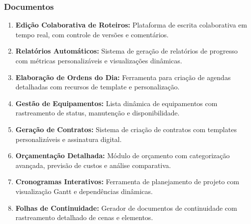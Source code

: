 \subsubsection{Documentos}
\begin{enumerate}[leftmargin=*]
    \item \textbf{Edição Colaborativa de Roteiros:} Plataforma de escrita colaborativa em tempo real, com controle de versões e comentários.
    \item \textbf{Relatórios Automáticos:} Sistema de geração de relatórios de progresso com métricas personalizáveis e visualizações dinâmicas.
    \item \textbf{Elaboração de Ordens do Dia:} Ferramenta para criação de agendas detalhadas com recursos de template e personalização.
    \item \textbf{Gestão de Equipamentos:} Lista dinâmica de equipamentos com rastreamento de status, manutenção e disponibilidade.
    \item \textbf{Geração de Contratos:} Sistema de criação de contratos com templates personalizáveis e assinatura digital.
    \item \textbf{Orçamentação Detalhada:} Módulo de orçamento com categorização avançada, previsão de custos e análise comparativa.
    \item \textbf{Cronogramas Interativos:} Ferramenta de planejamento de projeto com visualização Gantt e dependências dinâmicas.
    \item \textbf{Folhas de Continuidade:} Gerador de documentos de continuidade com rastreamento detalhado de cenas e elementos.
\end{enumerate}

